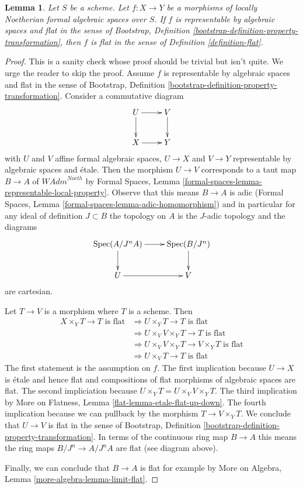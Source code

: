 \documentclass{stacks-project}
\theoremstyle{plain}
\newtheorem{lemma}[subsection]{Lemma}
\theoremstyle{definition}
\theoremstyle{remark}
\numberwithin{equation}{subsection}
\def\Spec{\mathop{\mathrm{Spec}}}
\begin{document}
\begin{lemma}
\label{lemma-representable-flat}
Let $S$ be a scheme. Let $f : X \to Y$ be a morphisms of
locally Noetherian formal algebraic spaces over $S$.
If $f$ is representable by algebraic spaces and
flat in the sense of Bootstrap, Definition
\ref{bootstrap-definition-property-transformation},
then $f$ is flat in the sense of Definition \ref{definition-flat}.
\end{lemma}

\begin{proof}
This is a sanity check whose proof should be trivial but isn't quite.
We urge the reader to skip the proof.
Assume $f$ is representable by algebraic spaces and
flat in the sense of Bootstrap, Definition
\ref{bootstrap-definition-property-transformation}.
Consider a commutative diagram
$$
\xymatrix{
U \ar[d] \ar[r] & V \ar[d] \\
X \ar[r] & Y
}
$$
with $U$ and $V$ affine formal algebraic spaces, $U \to X$ and $V \to Y$
representable by algebraic spaces and \'etale.
Then the morphism $U \to V$
corresponds to a taut map $B \to A$ of $\textit{WAdm}^{Noeth}$ by
Formal Spaces, Lemma
\ref{formal-spaces-lemma-representable-local-property}.
Observe that this means $B \to A$ is adic (Formal Spaces, Lemma
\ref{formal-spaces-lemma-adic-homomorphism})
and in particular for any ideal of definition $J \subset B$
the topology on $A$ is the $J$-adic topology and the diagrams
$$
\xymatrix{
\Spec(A/J^nA) \ar[r] \ar[d] & \Spec(B/J^n) \ar[d] \\
U \ar[r] & V
}
$$
are cartesian.

\medskip\noindent
Let $T \to V$ is a morphism where $T$ is a scheme. Then
\begin{align*}
X \times_Y T \to T\text{ is flat}
& \Rightarrow
U \times_Y T \to T\text{ is flat} \\
& \Rightarrow
U \times_V V \times_Y T \to T\text{ is flat} \\
& \Rightarrow
U \times_V V \times_Y T \to V \times_Y T\text{ is flat} \\
& \Rightarrow
U \times_V T \to T\text{ is flat}
\end{align*}
The first statement is the assumption on $f$.
The first implication because $U \to X$ is \'etale and hence flat
and compositions of flat morphisms of algebraic spaces are flat.
The second impliciation because $U \times_Y T = U \times_V V \times_Y T$.
The third implication by
More on Flatness, Lemma \ref{flat-lemma-etale-flat-up-down}.
The fourth implication because we can pullback by the morphism
$T \to V \times_Y T$.
We conclude that $U \to V$ is flat in the sense of
Bootstrap, Definition
\ref{bootstrap-definition-property-transformation}.
In terms of the continuous ring map $B \to A$
this means the ring maps $B/J^n \to A/J^nA$ are flat (see diagram above).

\medskip\noindent
Finally, we can conclude that $B \to A$ is flat for example
by More on Algebra, Lemma \ref{more-algebra-lemma-limit-flat}.
\end{proof}
\end{document}
